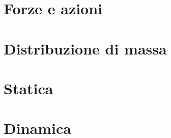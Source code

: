 


\chapter{Forze e azioni}
% 

\chapter{Distribuzione di massa}
% 

\chapter{Statica}
% 

\chapter{Dinamica}
% 
